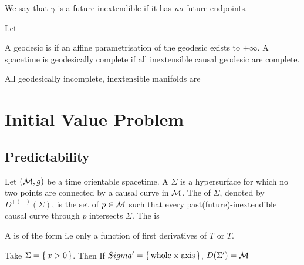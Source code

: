 \documentclass{article}
\begin{document}
We say that $\gamma$ is a future inextendible if it has \emph{no} future endpoints. 
\begin{example}
Let 
\end{example}

\begin{definition}
A geodesic is  if an affine parametrisation of the geodesic exists to $\pm\infty$. A spacetime is geodesically complete if all inextensible causal geodesic are complete. 
\end{definition}

\begin{theorem}
All geodesically incomplete, inextensible manifolds are 
\end{theorem}

\section{Initial Value Problem}
\subsection{Predictability}
\begin{definition}
Let $(\mathcal{M},g)$ be a time orientable spacetime. A  $\Sigma$ is a hypersurface for which no two points are connected by a causal curve in $\mathcal{M}$. The  of $\Sigma$, denoted by $D^{+(-)}(\Sigma)$, is the set of $p\in\mathcal{M}$ such that every past(future)-inextendible causal curve through $p$ intersects $\Sigma$. The  is 
\end{definition}

\begin{definition}
A  is of the form 
i.e only a function of  first derivatives of $T$ or $T$.
\end{definition}

\begin{example}
Take $\Sigma = \set{x>0}$. Then 
If $Sigma^\prime=\set{\text{whole x axis}}$, $D(\Sigma^\prime)=\mathcal{M}$
\end{example}
\end{document}
